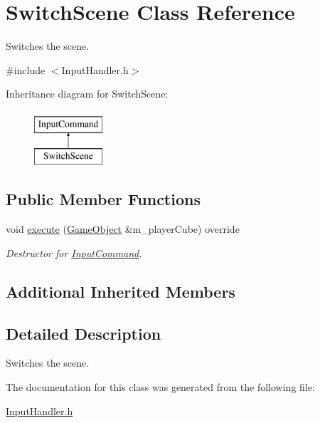 \hypertarget{class_switch_scene}{}\section{Switch\+Scene Class Reference}
\label{class_switch_scene}


Switches the scene.  




{\ttfamily \#include $<$Input\+Handler.\+h$>$}

Inheritance diagram for Switch\+Scene\+:\begin{figure}[H]
\begin{center}
\leavevmode
\includegraphics[height=2.000000cm]{class_switch_scene}
\end{center}
\end{figure}
\subsection*{Public Member Functions}
\begin{DoxyCompactItemize}
\item 
\mbox{\label{class_switch_scene_ac3edc1e9330066f0e83adb0b23a05eef}} 
void \mbox{\hyperlink{class_switch_scene_ac3edc1e9330066f0e83adb0b23a05eef}{execute}} (\mbox{\hyperlink{class_game_object}{Game\+Object}} \&m\+\_\+player\+Cube) override
\begin{DoxyCompactList}\small\item\em Destructor for \mbox{\hyperlink{class_input_command}{Input\+Command}}. \end{DoxyCompactList}\end{DoxyCompactItemize}
\subsection*{Additional Inherited Members}


\subsection{Detailed Description}
Switches the scene. 

The documentation for this class was generated from the following file\+:\begin{DoxyCompactItemize}
\item 
\mbox{\hyperlink{_input_handler_8h}{Input\+Handler.\+h}}\end{DoxyCompactItemize}

